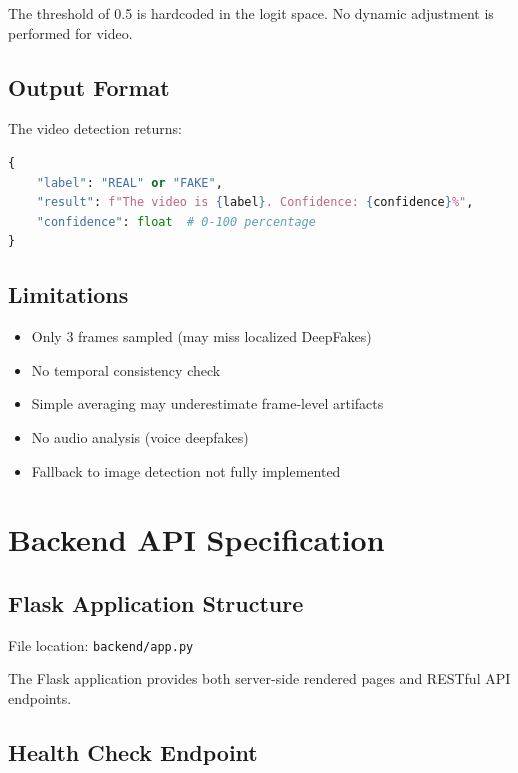 \documentclass[12pt,a4paper]{book}
\begin{document}
\begin{itemize}
The threshold of 0.5 is hardcoded in the logit space. No dynamic adjustment is performed for video.

\section{Output Format}

The video detection returns:

\begin{lstlisting}[language=Python]
{
    "label": "REAL" or "FAKE",
    "result": f"The video is {label}. Confidence: {confidence}%",
    "confidence": float  # 0-100 percentage
}
\end{lstlisting}

\section{Limitations}

\begin{itemize}
    \item Only 3 frames sampled (may miss localized DeepFakes)
    \item No temporal consistency check
    \item Simple averaging may underestimate frame-level artifacts
    \item No audio analysis (voice deepfakes)
    \item Fallback to image detection not fully implemented
\end{itemize}

\chapter{Backend API Specification}
\label{ch:api}

\section{Flask Application Structure}

File location: \texttt{backend/app.py}

The Flask application provides both server-side rendered pages and RESTful API endpoints.

\section{Health Check Endpoint}


\end{itemize}
\end{document}
